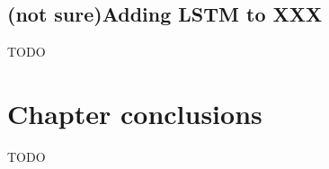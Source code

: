 
\subsection{(not sure)Adding LSTM to XXX}
\label{subsec:offline_bci_system_rnn_lstm_implementation}

TODO

\section{Chapter conclusions}
\label{sec:offline_bci_summary}

TODO